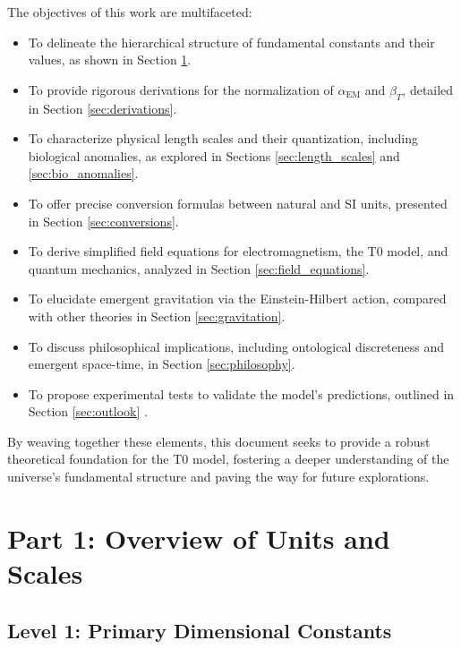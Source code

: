 \documentclass[12pt,a4paper]{article}
\begin{document}
	The objectives of this work are multifaceted:
	\begin{itemize}
		\item To delineate the hierarchical structure of fundamental constants and their values, as shown in Section \ref{sec:hierarchy}.
		\item To provide rigorous derivations for the normalization of \(\alpha_{\text{EM}}\) and \(\beta_T\), detailed in Section \ref{sec:derivations}.
		\item To characterize physical length scales and their quantization, including biological anomalies, as explored in Sections \ref{sec:length_scales} and \ref{sec:bio_anomalies}.
		\item To offer precise conversion formulas between natural and SI units, presented in Section \ref{sec:conversions}.
		\item To derive simplified field equations for electromagnetism, the T0 model, and quantum mechanics, analyzed in Section \ref{sec:field_equations}.
		\item To elucidate emergent gravitation via the Einstein-Hilbert action, compared with other theories in Section \ref{sec:gravitation}.
		\item To discuss philosophical implications, including ontological discreteness and emergent space-time, in Section \ref{sec:philosophy}.
		\item To propose experimental tests to validate the model’s predictions, outlined in Section \ref{sec:outlook} \cite{pascher_vereinheitlichung_2025}.
	\end{itemize}
	
	By weaving together these elements, this document seeks to provide a robust theoretical foundation for the T0 model, fostering a deeper understanding of the universe’s fundamental structure and paving the way for future explorations.
	
	\section{Part 1: Overview of Units and Scales}
	\label{sec:hierarchy}
	
	\subsection{Level 1: Primary Dimensional Constants}
	\label{subsec:level1}
	
\end{document}

